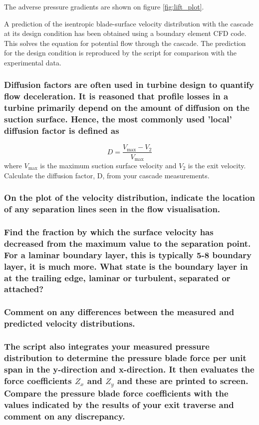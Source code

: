 \documentclass{article}
\begin{document}
The adverse pressure gradients are shown on figure \ref{fig:lift_plot}.

A prediction of the isentropic blade-surface velocity distribution with the cascade at its
design condition has been obtained using a boundary element CFD code. This solves the
equation for potential flow through the cascade. The prediction for the design condition is
reproduced by the script for comparison with the experimental data.

\subsubsection{Diffusion factors are often used in turbine design to quantify flow deceleration. It is
reasoned that profile losses in a turbine primarily depend on the amount of diffusion on the
suction surface. Hence, the most commonly used 'local' diffusion factor is defined as
}

\begin{equation}
    D = \frac{V_\text{max} - V_2}{V_\text{max}}
\end{equation}
where
$V_\text{max}$ is the maximum suction surface velocity and
$V_2$ is the exit velocity. Calculate the
diffusion factor, D, from your cascade measurements.

\subsubsection{On the plot of the velocity distribution, indicate the location of any separation lines seen
in the flow visualisation.}


\subsubsection{Find the fraction by which the surface velocity has decreased from the maximum value
to the separation point. For a laminar boundary layer, this is typically 5-8%
boundary layer, it is much more. What state is the boundary layer in at the trailing edge, laminar
or turbulent, separated or attached?}


\subsubsection{Comment on any differences between the measured and predicted velocity
distributions.}


\subsubsection{The script also integrates your measured pressure distribution to determine the pressure
blade force per unit span in the y-direction and x-direction. It then evaluates the force
coefficients $Z_x$ and $Z_y$ and these are printed to screen.
Compare the pressure blade force coefficients with the values indicated by the results of your
exit traverse and comment on any discrepancy.}
\end{document}

